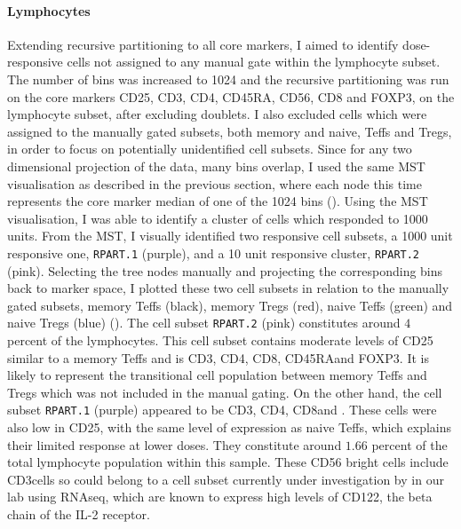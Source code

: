 \clearpage

\paragraph{Lymphocytes} 
Extending recursive partitioning to all core markers, I aimed to identify dose-responsive cells not assigned to any manual gate within the lymphocyte subset.
The number of bins was increased to 1024 and the recursive partitioning was run on the core markers CD25, CD3, CD4, CD45RA, CD56, CD8 and FOXP3, on the lymphocyte subset, after excluding doublets.
I also excluded cells which were assigned to the manually gated subsets, both memory and naive, Teffs and Tregs, in order to focus on potentially unidentified cell subsets.
Since for any two dimensional projection of the data, many bins overlap, I used the same \gls{MST} visualisation as described in the previous section, where each node this time represents the core marker median of one of the 1024 bins ().
Using the \gls{MST} visualisation, I was able to identify a cluster of cells which responded to 1000 units.
From the MST, I visually identified two responsive cell subsets, a 1000 unit responsive one, \texttt{RPART.1} (purple), and a 10 unit responsive cluster, \texttt{RPART.2} (pink).
Selecting the tree nodes manually and projecting the corresponding bins back to marker space, I plotted these two cell subsets in relation to the manually gated subsets, memory Teffs (black), memory Tregs (red), naive Teffs (green) and naive Tregs (blue) ().
The cell subset \texttt{RPART.2} (pink) constitutes around $4$ percent of the lymphocytes.
This cell subset contains moderate levels of CD25 similar to a memory Teffs and is CD3\positive, CD4\positive, CD8\negative, CD45RA\negative and FOXP3\negative.
It is likely to represent the transitional cell population between memory Teffs and Tregs which was not included in the manual gating.
On the other hand, the cell subset \texttt{RPART.1} (purple) appeared to be CD3\negative, CD4\negative, CD8\negative and \high.
These cells were also low in CD25, with the same level of expression as naive Teffs, which explains their limited response at lower doses.
They constitute around $1.66$ percent of the total lymphocyte population within this sample.
These CD56 bright cells include CD3\negative cells so could belong to a cell subset currently under investigation by  in our lab using RNAseq, which are known to express high levels of CD122, the beta chain of the IL-2 receptor.

